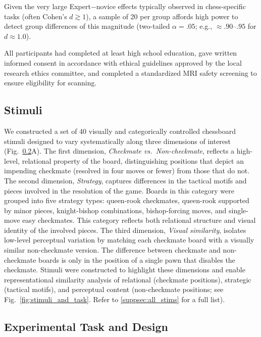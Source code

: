 \documentclass[preprint,12pt]{elsarticle}
\begin{document}
Given the very large Expert$-$novice effects typically observed in chess-specific tasks (often Cohen’s $d \gtrsim 1$), a sample of 20 per group affords high power to detect group differences of this magnitude (two-tailed $\alpha = .05$; e.g., $\approx .90$--$.95$ for $d \approx 1.0$). 

All participants had completed at least high school education, gave written informed consent in accordance with ethical guidelines approved by the local research ethics committee, and completed a standardized MRI safety screening to ensure eligibility for scanning.

\subsection{Stimuli}
We constructed a set of 40 visually and categorically controlled chessboard stimuli designed to vary systematically along three dimensions of interest (Fig.~\ref{sec:fmri_design}A). The first dimension, \emph{Checkmate vs.\ Non-checkmate}, reflects a high-level, relational property of the board, distinguishing positions that depict an impending checkmate (resolved in four moves or fewer) from those that do not. The second dimension, \emph{Strategy}, captures differences in the tactical motifs and pieces involved in the resolution of the game. Boards in this category were grouped into five strategy types: queen-rook checkmates, queen-rook supported by minor pieces, knight-bishop combinations, bishop-forcing moves, and single-move easy checkmates. This category reflects both relational structure and visual identity of the involved pieces. The third dimension, \emph{Visual similarity}, isolates low-level perceptual variation by matching each checkmate board with a visually similar non-checkmate version. The difference between checkmate and non-checkmate boards is only in the position of a single pawn that disables the checkmate. Stimuli were constructed to highlight these dimensions and enable representational similarity analysis of relational (checkmate positions), strategic (tactical motifs), and perceptual content (non-checkmate positions; see Fig.~\ref{fig:stimuli_and_task}. Refer to \ref{suppsec:all_stims} for a full list).

\subsection{Experimental Task and Design}\label{sec:fmri_design}
\end{document}
